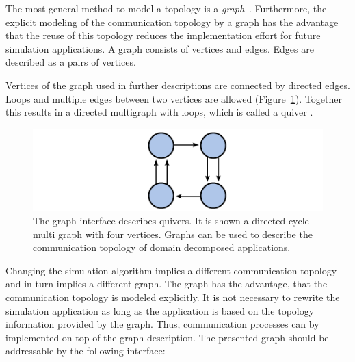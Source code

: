 The most general method to model a topology is a
\emph{graph}~\cite{ref:graph}. Furthermore, the explicit modeling of
the communication topology by a graph has the advantage that the reuse
of this topology reduces the implementation effort for future
simulation applications.  A graph consists of vertices and
edges. Edges are described as a pairs of vertices.


Vertices of the graph used in further descriptions are connected by
directed edges.  Loops and multiple edges between two vertices are
allowed (Figure~\ref{fig:graph}). Together this results in a directed
multigraph with loops, which is called a quiver \cite{ref:quiver}.

\begin{figure}[H]
  \centering \includegraphics[width=\textwidth]{graphics/30_graph}
  \caption{The graph interface describes quivers. It is shown a
    directed cycle multi graph with four vertices. Graphs can be
    used to describe the communication topology of domain decomposed
    applications.}
  \label{fig:graph}
\end{figure}

\noindent Changing the simulation algorithm implies a different
communication topology and in turn implies a different graph. The
graph has the advantage, that the communication topology is
modeled explicitly. It is not necessary to rewrite the simulation
application as long as the application is based on the topology
information provided by the graph. Thus, communication processes can
by implemented on top of the graph description. The presented graph
should be addressable by the following interface:

